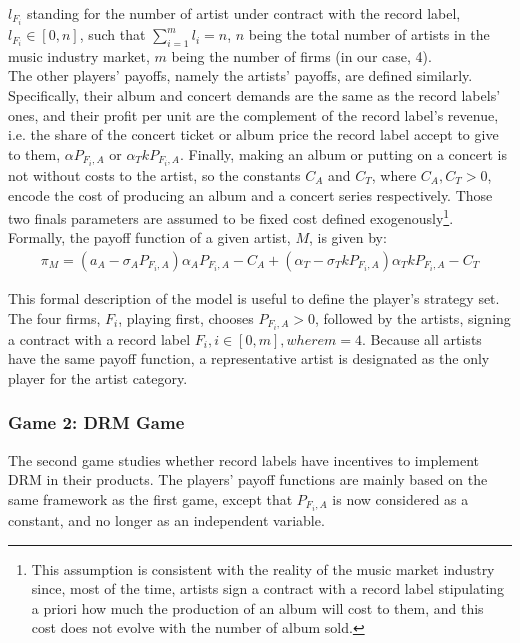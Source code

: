\documentclass[a4paper,12pt]{article}
\numberwithin{equation}{section}
\begin{document}
$l_{F_i}$ standing for the number of artist under contract with the record label, $l_{F_i} \in [0, n]$, such that $\sum_{i = 1}^m l_i = n$, $n$ being the total number of artists in the music industry market, $m$ being the number of firms (in our case, 4).\\

The other players’ payoffs, namely the artists’ payoffs, are defined similarly. Specifically, their album and concert demands are the same as the record labels’ ones, and their profit per unit are the complement of the record label’s revenue, i.e. the share of the concert ticket or album price the record label accept to give to them, $\alpha P_{F_i, A}$ or $\alpha_T k P_{F_i, A}$. Finally, making an album or putting on a concert is not without costs to the artist, so the constants $C_A$ and $C_T$, where $C_A, C_T > 0$,  encode the cost of producing an album and a concert series respectively. Those two finals parameters are assumed to be fixed cost defined exogenously\footnote{
This assumption is consistent with the reality of the music market industry since, most of the time, artists sign a contract with a record label stipulating a priori how much the production of an album will cost to them, and this cost does not evolve with the number of album sold.
}. Formally, the payoff function of a given artist, $M$, is given by:
\begin{eqnarray}
\pi_M = (a_A - \sigma_A P_{F_i, A})\alpha_A P_{F_i, A} - C_A
	+ (\alpha_T - \sigma_T k P_{F_i, A}) \alpha_T k P_{F_i, A} - C_T
\end{eqnarray}

This formal description of the model is useful to define the player’s strategy set. The four firms, $F_i$, playing first, chooses $P_{F_i, A} > 0$, followed by the artists, signing a contract with a record label $F_i, i \in [0, m], where m = 4$. Because all artists have the same payoff function, a representative artist is designated as the only player for the artist category.

\subsubsection{Game 2: DRM Game}

The second game studies whether record labels have incentives to implement DRM in their products. The players’ payoff functions are mainly based on the same framework as the first game, except that $P_{F_i, A}$ is now considered as a constant, and no longer as an independent variable.\\
\end{document}
